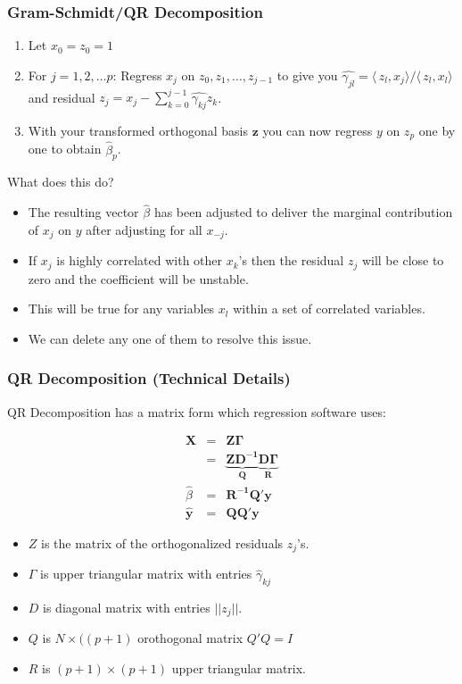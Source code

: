 \documentclass[xcolor=pdftex,dvipsnames,table,mathserif]{beamer}
\begin{document}
\begin{frame}
\frametitle{Gram-Schmidt/QR Decomposition}
\begin{enumerate}
\item Let $x_0 = z_0 = 1$
\item For $j = 1,2,\ldots p$: Regress $x_j$ on $z_0,z_1,\ldots,z_{j-1}$  to give you $\hat{\gamma_{jl}} = \langle\, z_l, x_j \rangle/\langle\, z_l, x_l \rangle$ and residual $z_j = x_j  - \sum_{k=0}^{j-1} \hat{\gamma_{kj}} z_k$.
\item With your transformed orthogonal basis $\mathbf{z}$ you can now regress $y$ on $z_p$ one by one to obtain $\hat{\beta}_p$.
\end{enumerate}
What does this do?
\begin{itemize}
\item The resulting vector $\hat{\beta}$ has been adjusted to deliver the marginal contribution of $x_j$ on $y$ after adjusting for all $x_{-j}$.
\item If $x_j$ is highly correlated with other $x_k$'s then the residual $z_j$ will be close to zero and the coefficient will be unstable.
\item This will be true for any variables $x_l$ within a set of correlated variables.
\item We can delete any one of them to resolve this issue.
\end{itemize}
\end{frame}


\begin{frame}
\frametitle{QR Decomposition (Technical Details)}
QR Decomposition has a matrix form which regression software uses:

\begin{eqnarray*}
\mathbf{X} &=& \mathbf{Z \Gamma} \\
    &=& \mathbf{\underbrace{Z D^{-1}}_{Q} \underbrace{D \Gamma}_{R}} \\
    \hat{\beta} &=& \mathbf{R^{-1} Q' y}\\
    \hat{\mathbf{y}} &=& \mathbf{Q Q'} \mathbf{y}
\end{eqnarray*}
\begin{itemize}
\item $Z$ is the matrix of the orthogonalized residuals $z_j$'s.
\item $\Gamma$ is upper triangular matrix with entries $\hat{\gamma}_{kj}$
\item $D$ is diagonal matrix with entries $|| z_j ||$.
\item $Q$ is $N \times ((p+1)$ orothogonal matrix $Q'Q = I$ 
\item $R$ is $(p+1) \times (p+1)$ upper triangular matrix.
\end{itemize}
\end{frame}
\end{document}

